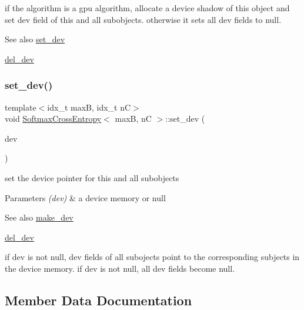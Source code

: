if the algorithm is a gpu algorithm, allocate a device shadow of this object and set dev field of this and all subobjects. otherwise it sets all dev fields to null. 

\begin{DoxySeeAlso}{See also}
\hyperlink{structSoftmaxCrossEntropy_a2fd71f3001bb7a06f4f4c2902c43b657}{set\+\_\+dev} 

\hyperlink{structSoftmaxCrossEntropy_acbef8ab0f759568a85decdcfd4a5353c}{del\+\_\+dev} 
\end{DoxySeeAlso}
\mbox{\label{structSoftmaxCrossEntropy_a2fd71f3001bb7a06f4f4c2902c43b657}} 
\subsubsection{\texorpdfstring{set\+\_\+dev()}{set\_dev()}}
{\footnotesize\ttfamily template$<$idx\+\_\+t maxB, idx\+\_\+t nC$>$ \\
void \hyperlink{structSoftmaxCrossEntropy}{Softmax\+Cross\+Entropy}$<$ maxB, nC $>$\+::set\+\_\+dev (\begin{DoxyParamCaption}\item[{\hyperlink{structSoftmaxCrossEntropy}{Softmax\+Cross\+Entropy}$<$ maxB, nC $>$ $\ast$}]{dev }\end{DoxyParamCaption})\hspace{0.3cm}{\ttfamily [inline]}}



set the device pointer for this and all subobjects 


\begin{DoxyParams}{Parameters}
{\em (dev)} & a device memory or null \\
\hline
\end{DoxyParams}
\begin{DoxySeeAlso}{See also}
\hyperlink{structSoftmaxCrossEntropy_ae02a6267c117629143f37216cad345a0}{make\+\_\+dev} 

\hyperlink{structSoftmaxCrossEntropy_acbef8ab0f759568a85decdcfd4a5353c}{del\+\_\+dev}
\end{DoxySeeAlso}
if dev is not null, dev fields of all subojects point to the corresponding subjects in the device memory. if dev is not null, all dev fields become null. 

\subsection{Member Data Documentation}
\mbox{\label{structSoftmaxCrossEntropy_a5a1e252b71ec4a89577e908abe7e723e}} 
